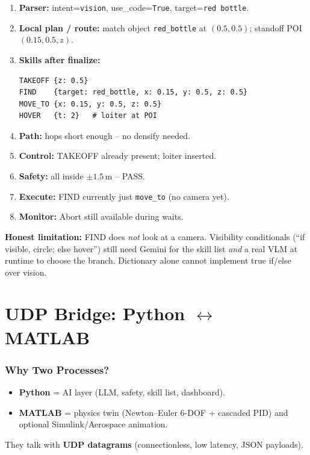 \documentclass[11pt,a4paper]{article}
\begin{document}
\begin{enumerate}[itemsep=3pt]
\item \textbf{Parser:} intent=\texttt{vision}, use\_code=\texttt{True}, target=\texttt{red bottle}.
\item \textbf{Local plan / route:} match object \texttt{red\_bottle} at $(0.5,0.5)$;
standoff POI $(0.15,0.5,z)$.
\item \textbf{Skills after finalize:}
\begin{verbatim}
TAKEOFF {z: 0.5}
FIND    {target: red_bottle, x: 0.15, y: 0.5, z: 0.5}
MOVE_TO {x: 0.15, y: 0.5, z: 0.5}
HOVER   {t: 2}   # loiter at POI
\end{verbatim}
\item \textbf{Path:} hops short enough -- no densify needed.
\item \textbf{Control:} TAKEOFF already present; loiter inserted.
\item \textbf{Safety:} all inside $\pm 1.5$\,m -- PASS.
\item \textbf{Execute:} FIND currently just \texttt{move\_to} (no camera yet).
\item \textbf{Monitor:} Abort still available during waits.
\end{enumerate}

\begin{quotebox}
\textbf{Honest limitation:} FIND does \emph{not} look at a camera. Visibility conditionals
(``if visible, circle; else hover'') still need Gemini for the skill list \emph{and}
a real VLM at runtime to choose the branch. Dictionary alone cannot implement true
if/else over vision.
\end{quotebox}

\part{UDP Bridge: Python $\leftrightarrow$ MATLAB}

\section{Why Two Processes?}

\begin{itemize}[itemsep=2pt]
\item \textbf{Python} = AI layer (LLM, safety, skill list, dashboard).
\item \textbf{MATLAB} = physics twin (Newton--Euler 6-DOF + cascaded PID) and optional
Simulink/Aerospace animation.
\end{itemize}
They talk with \textbf{UDP datagrams} (connectionless, low latency, JSON payloads).
\end{document}
